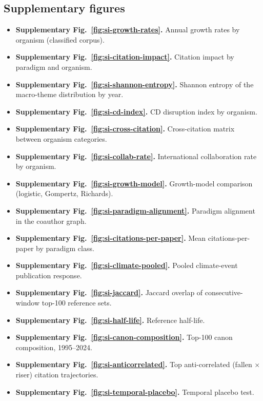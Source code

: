 \subsection*{Supplementary figures}
\begin{itemize}\setlength{\itemsep}{2pt}

\item \textbf{Supplementary Fig.~\ref{fig:si-growth-rates}.} Annual growth rates by
        organism (classified corpus).
\item \textbf{Supplementary Fig.~\ref{fig:si-citation-impact}.} Citation impact by paradigm
        and organism.
\item \textbf{Supplementary Fig.~\ref{fig:si-shannon-entropy}.} Shannon entropy of the
        macro-theme distribution by year.
\item \textbf{Supplementary Fig.~\ref{fig:si-cd-index}.} CD disruption index by
        organism.
\item \textbf{Supplementary Fig.~\ref{fig:si-cross-citation}.} Cross-citation matrix
        between organism categories.
\item \textbf{Supplementary Fig.~\ref{fig:si-collab-rate}.} International collaboration
        rate by organism.
\item \textbf{Supplementary Fig.~\ref{fig:si-growth-model}.} Growth-model
        comparison (logistic, Gompertz, Richards).
\item \textbf{Supplementary Fig.~\ref{fig:si-paradigm-alignment}.} Paradigm
        alignment in the coauthor graph.
\item \textbf{Supplementary Fig.~\ref{fig:si-citations-per-paper}.} Mean
        citations-per-paper by paradigm class.
\item \textbf{Supplementary Fig.~\ref{fig:si-climate-pooled}.} Pooled
        climate-event publication response.
\item \textbf{Supplementary Fig.~\ref{fig:si-jaccard}.} Jaccard
        overlap of consecutive-window top-100 reference sets.
\item \textbf{Supplementary Fig.~\ref{fig:si-half-life}.} Reference
        half-life.
\item \textbf{Supplementary Fig.~\ref{fig:si-canon-composition}.}
        Top-100 canon composition, 1995--2024.
\item \textbf{Supplementary Fig.~\ref{fig:si-anticorrelated}.} Top
        anti-correlated (fallen $\times$ riser) citation trajectories.

\item \textbf{Supplementary Fig.~\ref{fig:si-temporal-placebo}.} Temporal
        placebo test.
\end{itemize}

